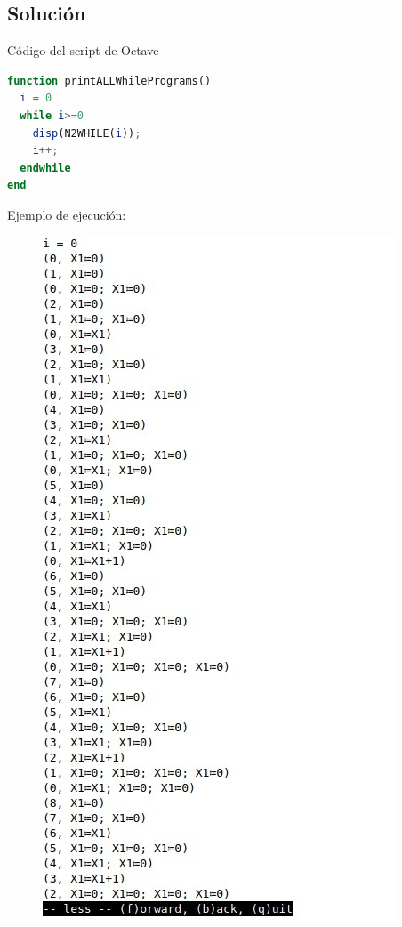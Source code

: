\documentclass{article}
\begin{document}
\subsection*{Solución}
Código del script de Octave
\begin{lstlisting}[language=Octave]
function printALLWhilePrograms()
  i = 0
  while i>=0
    disp(N2WHILE(i));
    i++;
  endwhile
end

\end{lstlisting}
Ejemplo de ejecución: \\
\begin{figure}[h]
    \centering
    \includegraphics[scale=0.5]{while.jpg}
\end{figure}
\end{document}
